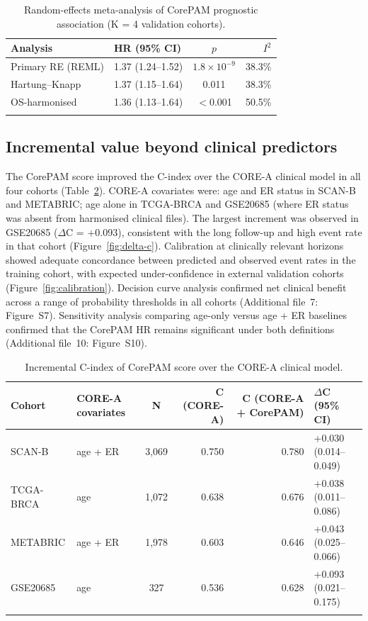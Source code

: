 \documentclass[referee,lineno,pdflatex,sn-vancouver-num]{sn-jnl}
\begin{document}
\begin{table}[h]
\caption{Random-effects meta-analysis of CorePAM prognostic association (K = 4 validation cohorts).}\label{tab:meta}
\begin{tabular}{@{}llcr@{}}
\toprule
Analysis & HR (95\% CI) & $p$ & $I^2$ \\
\midrule
Primary RE (REML) & 1.37 (1.24--1.52) & $1.8 \times 10^{-9}$ & 38.3\% \\
Hartung--Knapp & 1.37 (1.15--1.64) & 0.011 & 38.3\% \\
OS-harmonised & 1.36 (1.13--1.64) & $<$0.001 & 50.5\% \\
\botrule
\end{tabular}
\end{table}

\subsection{Incremental value beyond clinical predictors}\label{subsec:results-incremental}

The CorePAM score improved the C-index over the CORE-A clinical model in all four cohorts (Table~\ref{tab:incremental}). CORE-A covariates were: age and ER status in SCAN-B and METABRIC; age alone in TCGA-BRCA and GSE20685 (where ER status was absent from harmonised clinical files). The largest increment was observed in GSE20685 ($\Delta$C = +0.093), consistent with the long follow-up and high event rate in that cohort (Figure~\ref{fig:delta-c}). Calibration at clinically relevant horizons showed adequate concordance between predicted and observed event rates in the training cohort, with expected under-confidence in external validation cohorts (Figure~\ref{fig:calibration}). Decision curve analysis confirmed net clinical benefit across a range of probability thresholds in all cohorts (Additional file~7: Figure~S7). Sensitivity analysis comparing age-only versus age + ER baselines confirmed that the CorePAM HR remains significant under both definitions (Additional file~10: Figure~S10).

\begin{table}[h]
\caption{Incremental C-index of CorePAM score over the CORE-A clinical model.}\label{tab:incremental}
\begin{tabular}{@{}llcrrl@{}}
\toprule
Cohort & CORE-A covariates & N & C (CORE-A) & C (CORE-A + CorePAM) & $\Delta$C (95\% CI) \\
\midrule
SCAN-B & age + ER & 3,069 & 0.750 & 0.780 & +0.030 (0.014--0.049) \\
TCGA-BRCA & age & 1,072 & 0.638 & 0.676 & +0.038 (0.011--0.086) \\
METABRIC & age + ER & 1,978 & 0.603 & 0.646 & +0.043 (0.025--0.066) \\
GSE20685 & age & 327 & 0.536 & 0.628 & +0.093 (0.021--0.175) \\
\botrule
\end{tabular}
\end{table}
\end{document}
